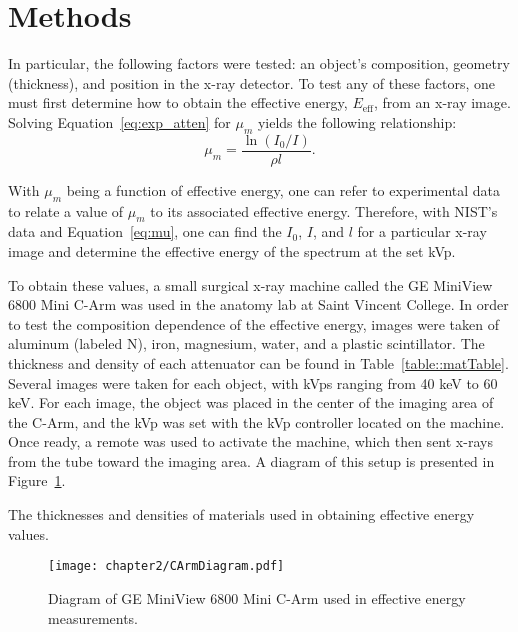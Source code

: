 \section{Methods}
\par In particular, the following factors were tested: an object's composition, geometry (thickness), and position in the x-ray detector. To test any of these factors, one must first determine how to obtain the effective energy, $E_{\text{eff}}$, from an x-ray image. Solving Equation~\ref{eq:exp_atten} for $\mu_m$ yields the following relationship:
\begin{equation}
    \mu_m = \frac{\ln{(I_0/I)}}{\rho l}.
\label{eq:mu}
\end{equation}
\par With $\mu_m$ being a function of effective energy, one can refer to experimental data to relate a value of $\mu_m$ to its associated effective energy. Therefore, with NIST's data \cite{hubbell1982photon} and Equation~\ref{eq:mu}, one can find the $I_0$, $I$, and $l$ for a particular x-ray image and determine the effective energy of the spectrum at the set kVp.

\par To obtain these values, a small surgical x-ray machine called the GE MiniView 6800 Mini C-Arm was used in the anatomy lab at Saint Vincent College. In order to test the composition dependence of the effective energy, images were taken of aluminum (labeled N), iron, magnesium, water, and a plastic scintillator. The thickness and density of each attenuator can be found in Table~\ref{table::matTable}. Several images were taken for each object, with kVps ranging from 40 keV to 60 keV. For each image, the object was placed in the center of the imaging area of the C-Arm, and the kVp was set with the kVp controller located on the machine. Once ready, a remote was used to activate the machine, which then sent x-rays from the tube toward the imaging area. A diagram of this setup is presented in Figure~\ref{figure:CArmDiagram}.

\begin{table}[H]
	\centering
    
    \caption{The thicknesses and densities of materials used in obtaining effective energy values.}
    \label{table::matTable}
\end{table}

\begin{figure}[H]
    \centering
	\texttt{[image: chapter2/CArmDiagram.pdf]}
	\caption{Diagram of GE MiniView 6800 Mini C-Arm used in effective energy measurements.}
	\label{figure:CArmDiagram}
\end{figure}

